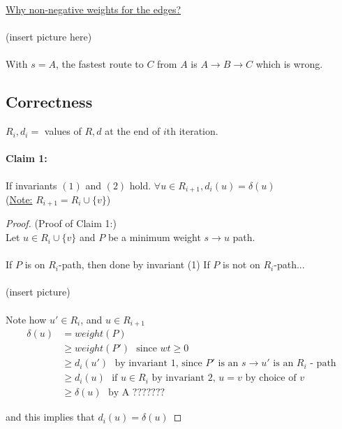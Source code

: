 \documentclass[12pt]{article}
\begin{document}
\underline{Why non-negative weights for the edges?}\\
\\
(insert picture here)
\\
\\
With $s = A$, the fastest route to $C$ from $A$ is $A \rightarrow B \rightarrow C$ which is wrong.

\subsection{Correctness}

$R_i, d_i = $ values of $R,d$ at the end of $i$th iteration.

\paragraph{Claim 1:} If invariants $(1)$ and $(2)$ hold. $\forall u \in R_{i+1}, d_i (u) = \delta (u)$\\
(\underline{Note:} $R_{i+1} = R_i \cup \{ v \}$)

\begin{proof}
	(Proof of Claim 1:)\\
	Let $u \in R_i \cup \{ v \}$ and $P$ be a minimum weight $s \rightarrow u$ path.\\
	\\
	If $P$ is on $R_i$-path, then done by invariant (1)
	If $P$ is not on $R_i$-path...\\
	\\
	(insert picture)
	\\
	\\
	Note how $u' \in R_i$, and $u \in R_{i+1}$
		\begin{align*}
		\delta (u) &= weight(P)\\
		&\geq weight(P') \:\:\:\text{since $wt \geq 0$}\\
		&\geq d_i (u') \:\:\:\text{by invariant 1, since $P'$ is an $s \rightarrow u'$ is an $R_i$ - path}\\
		&\geq d_i (u) \:\:\:\text{if $u\in R_i$ by invariant 2, $u=v$ by choice of $v$}\\
		&\geq \delta (u) \:\:\:\text{by A ???????}
	\end{align*}
	
	and this implies that $d_i (u) = \delta (u)$

\end{proof}
\end{document}
